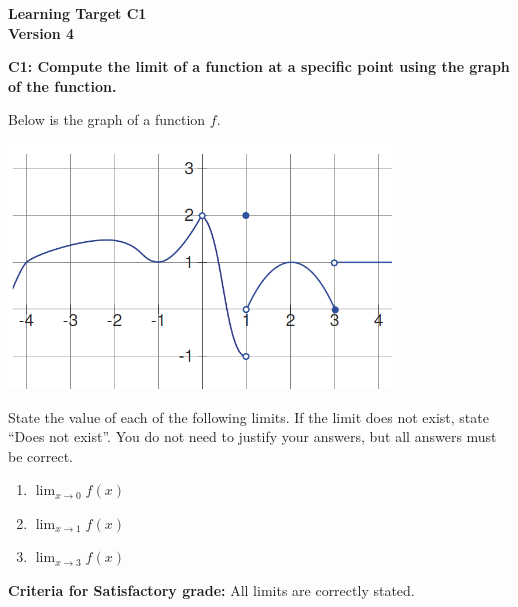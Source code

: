 \documentclass[10pt]{article}
\begin{document}
	\vspace*{0in}

		\begin{center}
			\textbf{Learning Target C1 \\
			Version 4} \\
		\end{center}


\begin{framed}
	\textbf{C1: Compute the limit of a function at a specific point using the graph of the function. }
\end{framed}

Below is the graph of a function $f$. 

\begin{center}
    \includegraphics[width=4in]{limits-oct16.png}
\end{center}

State the value of each of the following limits. If the limit does not exist, state ``Does not exist''. You do not need to justify your answers, but all answers must be correct. 

\begin{enumerate}
    \item $\displaystyle{\lim_{x \to 0} f(x)}$
    \item $\displaystyle{\lim_{x \to 1} f(x)}$
    \item $\displaystyle{\lim_{x \to 3} f(x)}$
\end{enumerate}


\vfill


\begin{small}
    \begin{framed}
        	\textbf{Criteria for Satisfactory grade:} All limits are correctly stated.
    \end{framed}

\end{small}
\end{document}
